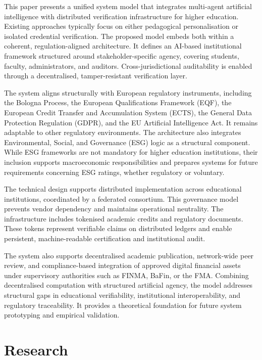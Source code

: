 \documentclass[oneside,10pt]{swissi}
\begin{document}
This paper presents a unified system model that integrates multi-agent artificial intelligence with distributed verification infrastructure for higher education. Existing approaches typically focus on either pedagogical personalisation or isolated credential verification. The proposed model embeds both within a coherent, regulation-aligned architecture. It defines an AI-based institutional framework structured around stakeholder-specific agency, covering students, faculty, administrators, and auditors. Cross-jurisdictional auditability is enabled through a decentralised, tamper-resistant verification layer.

The system aligns structurally with European regulatory instruments, including the Bologna Process, the European Qualifications Framework (EQF), the European Credit Transfer and Accumulation System (ECTS), the General Data Protection Regulation (GDPR), and the EU Artificial Intelligence Act. It remains adaptable to other regulatory environments. The architecture also integrates Environmental, Social, and Governance (ESG) logic as a structural component. While ESG frameworks are not mandatory for higher education institutions, their inclusion supports macroeconomic responsibilities and prepares systems for future requirements concerning ESG ratings, whether regulatory or voluntary.

The technical design supports distributed implementation across educational institutions, coordinated by a federated consortium. This governance model prevents vendor dependency and maintains operational neutrality. The infrastructure includes tokenised academic credits and regulatory documents. These tokens represent verifiable claims on distributed ledgers and enable persistent, machine-readable certification and institutional audit.

The system also supports decentralised academic publication, network-wide peer review, and compliance-based integration of approved digital financial assets under supervisory authorities such as FINMA, BaFin, or the FMA. Combining decentralised computation with structured artificial agency, the model addresses structural gaps in educational verifiability, institutional interoperability, and regulatory traceability. It provides a theoretical foundation for future system prototyping and empirical validation.

\section{Research}
\end{document}
